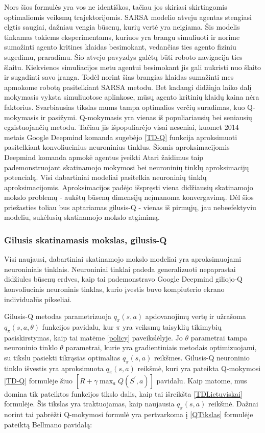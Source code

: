 \documentclass[a4paper, 12pt]{article}
\begin{document}
Nors šios formulės yra vos ne identiškos, tačiau jos skiriasi skirtingomis optimaliomis veiksmų trajektorijomis. SARSA modelio atveju agentas stengiasi elgtis saugiai, dažniau vengia būsenų, kurių vertė yra neigiama. Šis modelis tinkamas tokiems eksperimentams, kuriuos yra brangu simuliuoti ir norime sumažinti agento kritines klaidas besimokant, vedančias ties agento fiziniu sugedimu, praradimu. Šio atvejo pavyzdys galėtų būti roboto navigacija ties šlaitu. Kiekvienos simuliacijos metu agentui besimokant jis gali nukristi nuo šlaito ir sugadinti savo įranga. Todėl norint šias brangias klaidas sumažinti mes apmokome robotą pasitelkiant SARSA metodu. Bet kadangi didžiąja laiko dalį mokymasis vyksta simuliuotose aplinkose, mūsų agento kritinių klaidų kaina nėra faktorius. Svarbiausias tikslas mums tampa optimalios verčių suradimas, kuo Q-mokymasis ir pasižymi. Q-mokymasis \cite{QLearning} yra vienas iš populiariausių bei seniausių egzistuojančių metodu. Tačiau jis išpopuliarėjo visai neseniai, kuomet 2014 metais Google Deepmind komanda sugebėjo \ref{TD-Q} funkcija aproksimuoti pasitelkiant konvoliucinius neuroninius tinklus. Šiomis aproksimacijomis Deepmind komanda apmokė agentus įveikti Atari žaidimus taip pademonstruojant skatinamojo mokymosi bei neuroninių tinklų aproksimacijų potencialą. Visi dabartiniai modeliai pasitelkia neuroninių tinklų aproksimacijomis. Aproksimacijos padėjo išspręsti viena didžiausių skatinamojo mokslo problemų - aukštų būsenų dimensijų neįmanoma konvergavimą. Dėl šios priežasties toliau bus aptariamas gilusis-Q - vienas iš pirmųjų, jau nebeefektyviu modeliu, sukėlusių skatinamojo mokslo atgimimą.

\subsubsection{Gilusis skatinamasis mokslas, gilusis-Q}
\label{GilusisQSkyrius}
Visi naujausi, dabartiniai skatinamojo mokslo modeliai yra aproksimuojami neuroniniais tinklais. Neuroniniai tinklai padeda generalizuoti nepaprastai didžiules būsenų erdves, kaip tai pademonstravo Google Deepmind giliojo-Q konvoliucinis neuroninis tinklas\cite{AtariGoogle}, kurio įvestis buvo kompiuterio ekrano individualūs pikseliai. 

Gilusis-Q metodas parametrizuoja $q_{\pi}(s, a)$ apdovanojimų vertę ir užrašoma $q_{\pi}(s, a, \theta)$ funkcijos pavidalu, kur $\pi$ yra veiksmų taisyklių tikimybių pasiskirstymas, kaip tai matėme \ref{policy} paveikslėlyje. Jo $\theta$ parametrai tampa neuroninio tinklo $\theta$ parametrai, kurie yra gradientiniais metodais optimizuojami, su tikslu pasiekti tikrąsias optimalias $q_{\pi}(s, a)$ reikšmes. Gilusis-Q neuroninio tinklo išvestis yra aproksimuota $q_{\pi}(s, a)$ reikšmė, kuri yra pateikta Q-mokymosi \ref{TD-Q} formulėje šiuo $\left[R+\gamma \max _{a} Q\left(S^{\prime}, a\right)\right]$ pavidalu. Kaip matome, mus domina tik pateiktos funkcijos tikslo dalis, kaip tai išreikšta \ref{TDLietuviskai} formulėje. Šis tikslas yra traktuojamas, kaip naujausia $q_{\pi}(s, a)$ reikšmė. Dažnai norint tai pabrėžti Q-mokymosi formulė yra pertvarkoma į \ref{QTikslas} formulėje pateiktą Bellmano pavidalą:
\end{document}
